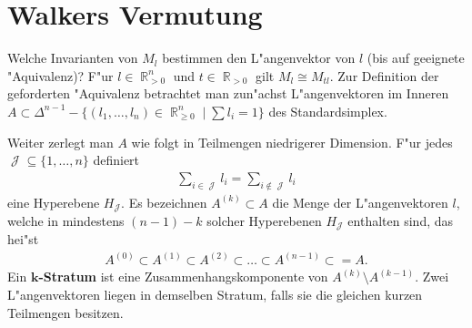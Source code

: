 \documentclass[paper=A4, twoside, chapterprefix=true, bibliography=totoc, headsepline]{scrbook}
\newcommand{\tikzgitter}[3][0.25]{ %
	\draw[step=#1,gray!15] #2 grid #3;
	\draw[step=2*#1,gray!30] #2 grid #3;
	\fill (0,0) circle(0.1); 
}
\DeclareMathOperator{\R}{\mathbb{R}}
\DeclareMathOperator{\calJ}{{\mathcal{J}}}
\theoremstyle{nonumberbreak}
\theoremstyle{emptybreak}
\theoremstyle{break}
\newcommand{\CmIndex}[2][]{\ifthenelse{\isempty{#1}}{\index{#2}}{\index{#1}}#2}
\newcommand{\CmMark}[2][]{\textbf{\CmIndex[#1]{#2}}}
\begin{document}
\section{Walkers Vermutung}

Welche Invarianten von $M_l$ bestimmen den L"angenvektor von $l$ (bis auf geeignete "Aquivalenz)?
F"ur $l \in \R_{>0}^n$ und $t \in \R_{> 0}$ gilt $M_l \cong M_{tl}$.
Zur Definition der geforderten "Aquivalenz betrachtet man zun"achst L"angenvektoren im Inneren $A \subset \Delta^{n-1} - \{ (l_1, \ldots, l_n) \in \R_{\ge 0}^n \mid \sum l_i = 1\}$ des Standardsimplex.

Weiter zerlegt man $A$ wie folgt in Teilmengen niedrigerer Dimension.
F"ur jedes $\calJ \subseteq \{1, \ldots, n\}$ definiert
\begin{align*}
	\sum_{i \in \calJ} l_i = \sum_{i \notin \calJ} l_i
\end{align*}
eine Hyperebene $H_{\calJ}$.
Es bezeichnen $A^{(k)} \subset A$ die Menge der L"angenvektoren $l$, welche in mindestens $(n-1)-k$ solcher Hyperebenen $H_{\calJ}$ enthalten sind, das hei"st
\begin{align*}
	A^{(0)} \subset A^{(1)} \subset A^{(2)} \subset \ldots \subset A^{(n-1)} \subset = A.
\end{align*}
Ein \CmMark[Stratum]{$\bm{k}$-Stratum} ist eine Zusammenhangskomponente von $A^{(k)} \setminus A^{(k-1)}$.
Zwei L"angenvektoren liegen in demselben Stratum, falls sie die gleichen kurzen Teilmengen besitzen.
\begin{center}\end{center}
\end{document}
